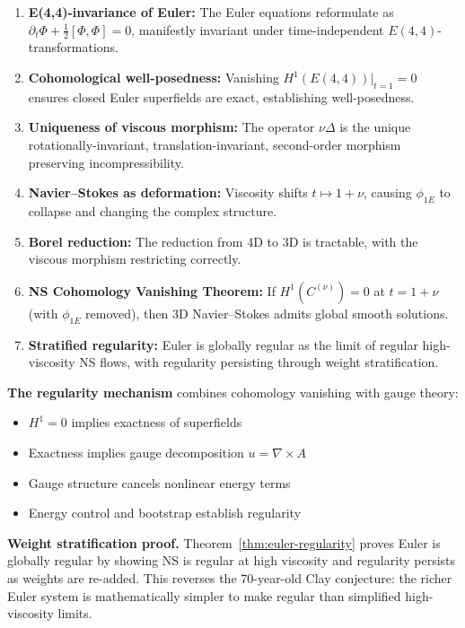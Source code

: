 \documentclass[reqno,10pt]{amsart}
\theoremstyle{plain}
\theoremstyle{definition}
\def\gE{E(4,4)}
\begin{document}
\begin{enumerate}
\item \textbf{E(4,4)-invariance of Euler:} The Euler equations reformulate as $\partial_t\Phi + \tfrac{1}{2}[\Phi,\Phi]=0$, manifestly invariant under time-independent $\gE$-transformations.

\item \textbf{Cohomological well-posedness:} Vanishing $H^1(\gE)|_{t=1}=0$ ensures closed Euler superfields are exact, establishing well-posedness.

\item \textbf{Uniqueness of viscous morphism:} The operator $\nu\Delta$ is the unique rotationally-invariant, translation-invariant, second-order morphism preserving incompressibility.

\item \textbf{Navier--Stokes as deformation:} Viscosity shifts $t\mapsto 1+\nu$, causing $\phi_{1E}$ to collapse and changing the complex structure.

\item \textbf{Borel reduction:} The reduction from 4D to 3D is tractable, with the viscous morphism restricting correctly.

\item \textbf{NS Cohomology Vanishing Theorem:} If $H^1(C^{(\nu)})=0$ at $t=1+\nu$ (with $\phi_{1E}$ removed), then 3D Navier--Stokes admits global smooth solutions.

\item \textbf{Stratified regularity:} Euler is globally regular as the limit of regular high-viscosity NS flows, with regularity persisting through weight stratification.
\end{enumerate}

\textbf{The regularity mechanism} combines cohomology vanishing with gauge theory:
\begin{itemize}
\item $H^1=0$ implies exactness of superfields
\item Exactness implies gauge decomposition $u=\nabla\times A$
\item Gauge structure cancels nonlinear energy terms
\item Energy control and bootstrap establish regularity
\end{itemize}

\textbf{Weight stratification proof.} Theorem~\ref{thm:euler-regularity} proves Euler is globally regular by showing NS is regular at high viscosity and regularity persists as weights are re-added. This reverses the 70-year-old Clay conjecture: the richer Euler system is mathematically simpler to make regular than simplified high-viscosity limits.
\end{document}
